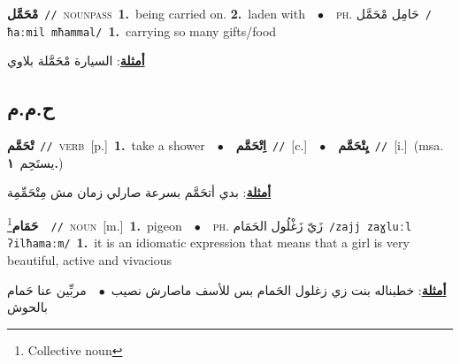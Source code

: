 \documentclass[10pt,a4paper,twoside]{article} %
\begin{document}
\begin{multicols}{2}
{\setlength\topsep{0pt}\textbf{\foreignlanguage{arabic}{مْحَمَّل}}\ {\color{gray}\texttt{//}\color{black}}\ \textsc{noun\textunderscore pass}\ \textbf{1.}~being carried on.  \textbf{2.}~laden with\ \ $\bullet$\ \ \textsc{ph.} \color{gray} \foreignlanguage{arabic}{حَامِل مْحَمَّل}\color{black}\ {\color{gray}\texttt{/{\sffamily ħaːmil mħammal}/}\color{black}}\ \textbf{1.}~carrying so many gifts/food\  \begin{flushright}\color{gray}\foreignlanguage{arabic}{\textbf{\underline{\foreignlanguage{arabic}{أمثلة}}}: السيارة مْحَمَّلة بلاوي}\end{flushright}\color{black}} \vspace{2mm}

\vspace{-3mm}
\subsection*{\color{blue}\foreignlanguage{arabic}{ح.م.م}\color{blue}{}} 

{\setlength\topsep{0pt}\textbf{\foreignlanguage{arabic}{تْحَمَّم}}\ {\color{gray}\texttt{//}\color{black}}\ \textsc{verb}\ [p.]\ \textbf{1.}~take a shower\ \ $\bullet$\ \ \setlength\topsep{0pt}\textbf{\foreignlanguage{arabic}{اِتْحَمَّم}}\ {\color{gray}\texttt{//}\color{black}}\ [c.]\ \ $\bullet$\ \ \setlength\topsep{0pt}\textbf{\foreignlanguage{arabic}{يِتْحَمَّم}}\ {\color{gray}\texttt{//}\color{black}}\ [i.]\ \color{gray}(msa. \foreignlanguage{arabic}{يستَحِم}~\foreignlanguage{arabic}{\textbf{١.}})\color{black}\  \begin{flushright}\color{gray}\foreignlanguage{arabic}{\textbf{\underline{\foreignlanguage{arabic}{أمثلة}}}: بدي أتحَمَّم بسرعة صارلي زمان مش مِتْحَمِّمِة}\end{flushright}\color{black}} \vspace{2mm}

{\setlength\topsep{0pt}\textbf{\foreignlanguage{arabic}{حَمَام}}\footnote{Collective noun}\ \ {\color{gray}\texttt{//}\color{black}}\ \textsc{noun}\ [m.]\ \textbf{1.}~pigeon\ \ $\bullet$\ \ \textsc{ph.} \color{gray} \foreignlanguage{arabic}{زَيّ زَغْلُول الحَمَام}\color{black}\ {\color{gray}\texttt{/{\sffamily zajj zaɣluːl ʔilħamaːm}/}\color{black}}\ \textbf{1.}~it is an idiomatic expression that means that a girl is very beautiful, active and vivacious\  \begin{flushright}\color{gray}\foreignlanguage{arabic}{\textbf{\underline{\foreignlanguage{arabic}{أمثلة}}}: خطبناله بنت زي زغلول الحَمام بس للأسف ماصارش نصيب\ $\bullet$\ \  مربِّين عنا حَمام بالحوش}\end{flushright}\color{black}} \vspace{2mm}


\end{multicols}
\end{document}
